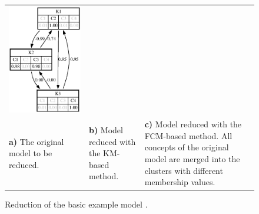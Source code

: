 \documentclass[graybox]{svmult}
\begin{document}
\begin{center}
\begin{figure}
\begin{tabular}{p{}p{}p{}}
      \includegraphics[width=\linewidth]{fClustered.eps} \\
      \textbf{a)} The original model to be reduced. &
      \textbf{b)} Model reduced with the KM-based method. &
      \textbf{c)} Model reduced with the FCM-based method. All concepts of the original model are merged into the clusters with different membership values.\\
    \end{tabular}
    \caption{Reduction of the basic example model \cite{hatwagnernovel}.}
    \label{fig:simpleExample}
  \end{figure}
\end{center}
\end{document}

